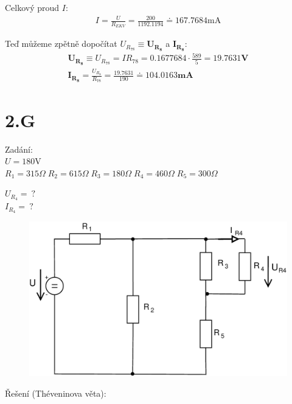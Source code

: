 \documentclass[12pt,a4paper]{article}
\begin{document}
	Celkový proud $I$:
	\begin{gather*}
		I = \frac{U}{R_{EKV}} = \frac{200}{1192.1194} \doteq 167.7684 \text{mA}
	\end{gather*}

	Teď můžeme zpětně dopočítat $U_{R_{78}} \equiv \boldsymbol{U_{R_8}}$ a $\boldsymbol{I_{R_8}}$:
	\begin{gather*}
		\boldsymbol{U_{R_8}} \equiv U_{R_{78}} = I R_{78} = 0.1677684 \cdot \frac{589}{5} = \boldsymbol{19.7631 \textbf{V}} \\
		\boldsymbol{I_{R_8}} = \frac{U_{R_8}}{R_{78}} = \frac{19.7631}{190} \doteq \boldsymbol{104.0163 \textbf{mA}}
	\end{gather*}

	\newpage


	\section*{2.G}

	{\Large Zadání:} \\
	$U = 180 \text{V}$ \\
	$R_1 = 315 \Omega \; R_2 = 615 \Omega \; R_3 = 180 \Omega \; R_4 = 460 \Omega \; R_5 = 300 \Omega$

	$U_{R_4} = \: \text{?}$ \\
	$I_{R_4} = \: \text{?}$ \\

	\begin{figure}[H] 
		\vspace{-0.5cm}
		\center\includegraphics[width=0.6\linewidth]{obr/2_1}
	\end{figure}

	{\Large Řešení (Théveninova věta):} \\
\end{document}
